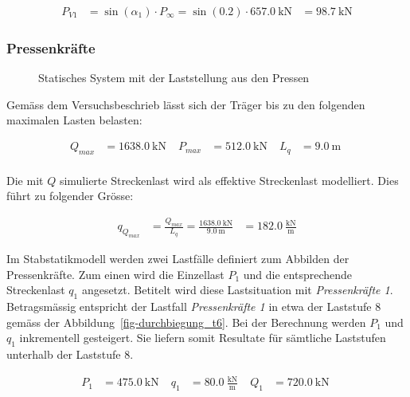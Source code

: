 \documentclass[
  11pt,
  letterpaper,
]{scrreprt}
\begin{document}
$$
\begin{aligned}
P_{V1} &= \sin \left( \alpha_{1} \right) \cdot P_{\infty}  = \sin \left( 0.2 \right) \cdot 657.0\ \mathrm{kN} &= 98.7\ \mathrm{kN}  
\end{aligned}
$$

\subsubsection{Pressenkräfte}\label{pressenkruxe4fte}

\begin{figure}[H]


\caption{\label{fig-t6_lastfall_versuch}Statisches System mit der
Laststellung aus den Pressen}

\end{figure}%

Gemäss dem Versuchsbeschrieb lässt sich der Träger bis zu den folgenden
maximalen Lasten belasten:

$$
\begin{aligned}
Q_{max} &= 1638.0\ \mathrm{kN} \; 
 &P_{max} &= 512.0\ \mathrm{kN} \; 
 &L_{q} &= 9.0\ \mathrm{m} \; 
\\[10pt]
\end{aligned}
$$

Die mit \(Q\) simulierte Streckenlast wird als effektive Streckenlast
modelliert. Dies führt zu folgender Grösse:

$$
\begin{aligned}
q_{Q_{max}} &= \frac{ Q_{max} }{ L_{q} }  = \frac{ 1638.0\ \mathrm{kN} }{ 9.0\ \mathrm{m} } &= 182.0\ \frac{\mathrm{kN}}{\mathrm{m}}  
\end{aligned}
$$

Im Stabstatikmodell werden zwei Lastfälle definiert zum Abbilden der
Pressenkräfte. Zum einen wird die Einzellast \(P_{1}\) und die
entsprechende Streckenlast \(q_{1}\) angesetzt. Betitelt wird diese
Lastsituation mit \emph{Pressenkräfte 1}. Betragsmässig entspricht der
Lastfall \emph{Pressenkräfte 1} in etwa der Laststufe 8 gemäss der
Abbildung~\ref{fig-durchbiegung_t6}. Bei der Berechnung werden \(P_1\)
und \(q_1\) inkrementell gesteigert. Sie liefern somit Resultate für
sämtliche Laststufen unterhalb der Laststufe 8.

$$
\begin{aligned}
P_{1} &= 475.0\ \mathrm{kN} \; 
 &q_{1} &= 80.0\ \frac{\mathrm{kN}}{\mathrm{m}} \; 
 &Q_{1} &= 720.0\ \mathrm{kN} \; 
\\[10pt]
\end{aligned}
$$
\end{document}
